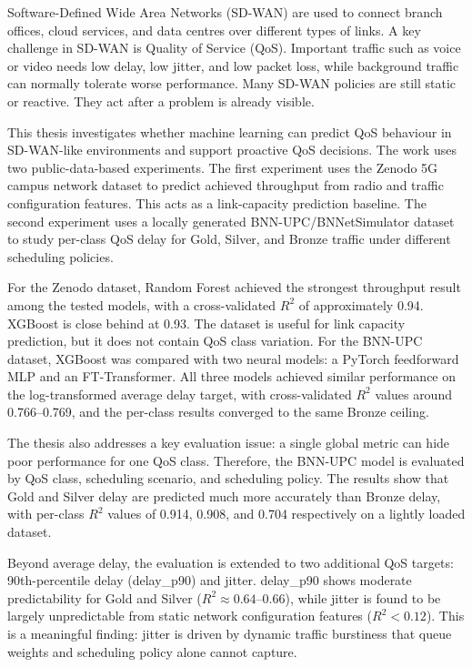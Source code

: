 \documentclass[a4paper,12pt]{Classes/RoboticsLaTeX}
\begin{document}
	
	\begin{abstracts}
Software-Defined Wide Area Networks (SD-WAN) are used to connect branch offices, cloud services, and data centres over different types of links. A key challenge in SD-WAN is Quality of Service (QoS). Important traffic such as voice or video needs low delay, low jitter, and low packet loss, while background traffic can normally tolerate worse performance. Many SD-WAN policies are still static or reactive. They act after a problem is already visible.

This thesis investigates whether machine learning can predict QoS behaviour in SD-WAN-like environments and support proactive QoS decisions. The work uses two public-data-based experiments. The first experiment uses the Zenodo 5G campus network dataset to predict achieved throughput from radio and traffic configuration features. This acts as a link-capacity prediction baseline. The second experiment uses a locally generated BNN-UPC/BNNetSimulator dataset to study per-class QoS delay for Gold, Silver, and Bronze traffic under different scheduling policies.

For the Zenodo dataset, Random Forest achieved the strongest throughput result among the tested models, with a cross-validated $R^2$ of approximately 0.94. XGBoost is close behind at 0.93. The dataset is useful for link capacity prediction, but it does not contain QoS class variation. For the BNN-UPC dataset, XGBoost was compared with two neural models: a PyTorch feedforward MLP and an FT-Transformer. All three models achieved similar performance on the log-transformed average delay target, with cross-validated $R^2$ values around 0.766--0.769, and the per-class results converged to the same Bronze ceiling.

The thesis also addresses a key evaluation issue: a single global metric can hide poor performance for one QoS class. Therefore, the BNN-UPC model is evaluated by QoS class, scheduling scenario, and scheduling policy. The results show that Gold and Silver delay are predicted much more accurately than Bronze delay, with per-class $R^2$ values of 0.914, 0.908, and 0.704 respectively on a lightly loaded dataset.

Beyond average delay, the evaluation is extended to two additional QoS targets: 90th-percentile delay (delay\_p90) and jitter. delay\_p90 shows moderate predictability for Gold and Silver ($R^2 \approx 0.64$--0.66), while jitter is found to be largely unpredictable from static network configuration features ($R^2 < 0.12$). This is a meaningful finding: jitter is driven by dynamic traffic burstiness that queue weights and scheduling policy alone cannot capture.


\end{abstracts}
\end{document}
